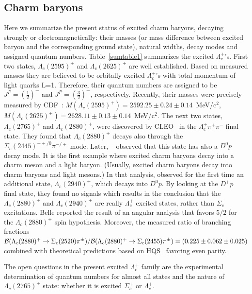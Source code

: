 \subsection{Charm baryons}


Here we summarize the present status of excited charm baryons, 
decaying strongly or electromagnetically: their masses (or 
mass difference between excited baryon and the corresponding 
ground state), natural widths, decay modes and 
assigned quantum numbers. 
Table~\ref{sumtable1} summarizes the excited $\Lambda_c^+$'s.  
First two states, $\Lambda_c(2595)^+$ and $\Lambda_c(2625)^+$ 
are well established. 
Based on measured masses they are believed to be orbitally 
excited $\Lambda_c^+$'s with total momentum of light quarks 
L=1. Therefore, their quantum numbers are assigned to be 
$J^P=(\frac{1}{2})^-$ and $J^P=(\frac{3}{2})^-$, respectively. Recently, 
their masses 
were precisely measured by CDF~\cite{Aaltonen:2011sf}: 
$M(\Lambda_c(2595)^+)=2592.25\pm 0.24\pm 0.14$~MeV/c$^2$, 
$M(\Lambda_c(2625)^+)=2628.11\pm 0.13\pm 0.14$~MeV/c$^2$. 
The next two states, $\Lambda_c(2765)^+$ and $\Lambda_c(2880)^+$, 
were discovered by CLEO~\cite{Artuso:2000xy} in the $\Lambda_c^+\pi^+\pi^-$ 
final state. 
They found that $\Lambda_c(2880)^+$ decays also through the 
$\Sigma_c(2445)^{++/0}\pi^{-/+}$ mode. 
Later, \babar~\cite{Aubert:2006sp} 
observed that this state has also a $D^0 p$ decay mode. It is the 
first example where excited charm baryons decay into a charm meson 
and a light baryon. (Usually, excited charm baryons decay into charm 
baryons and light mesons.) In that analysis, \babar 
observed for the first time an additional state, $\Lambda_c(2940)^+$, 
which decays into $D^0 p$. By looking at the $D^+ p$ final state, they found 
no signals which results in the conclusion that the $\Lambda_c(2880)^+$ 
and $\Lambda_c(2940)^+$ are really 
$\Lambda_c^+$ excited states, rather than $\Sigma_c$ excitations. 
Belle reported the result of an angular analysis that favors $5/2$ 
for the $\Lambda_c(2880)^+$ spin hypothesis. 
Moreover, the measured ratio of branching fractions 
${\cal B}(\Lambda_c(2880)^+\rightarrow \Sigma_c(2520)\pi^{\pm})/{\cal B}(\Lambda_c(2880)^+\rightarrow \Sigma_c(2455)\pi^{\pm})=(0.225\pm 0.062\pm 0.025)$ combined 
with theoretical predictions based on HQS~\cite{Isgur:1991wq,Cheng:2006dk} 
favoring even parity.     

The open questions in the present excited $\Lambda_c^+$ family are the 
experimental determination of quantum numbers for almost all states and 
the nature of $\Lambda_c(2765)^+$ state: whether it is excited $\Sigma_c^+$ 
or $\Lambda_c^+$.

